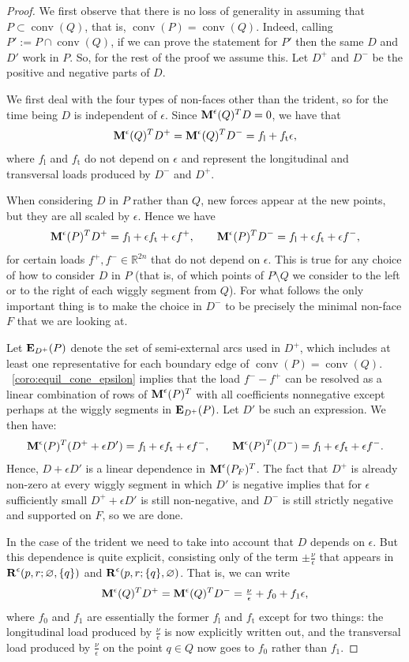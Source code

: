 \documentclass{amsart}
\theoremstyle{definition}
\newcommand{\R}{\mathbb{R}} %
\renewcommand{\b}[1]{{\boldsymbol{#1}}} %
\DeclareMathOperator{\conv}{conv} %
\newcommand{\Rvector}{\b{\rm R}} %
\newcommand{\lon}{\operatorname{l}} %
\newcommand{\trans}{\operatorname{t}} %
\newcommand{\Reps}{\Rvector^\epsilon} %
\newcommand{\Mmatrix}{\b{\rm M}} %
\newcommand{\Ematrix}{\b{\rm E}} %
\newcommand{\Meps}{\Mmatrix^\epsilon} %
\begin{document}
\begin{proof}
We first observe that there is no loss of generality in assuming that $P\subset \conv(Q)$, that is, $\conv(P)= \conv(Q)$. Indeed, calling $P' := P\cap \conv(Q)$, if we can prove the statement for $P'$ then the same $D$ and $D'$ work in $P$.
So, for the rest of the proof we assume this.
Let $D^+$ and $D^-$ be the positive and negative parts of $D$.

We first deal with the four types of non-faces other than the trident, so for the time being $D$ is independent of $\epsilon$.
%
Since $\Meps(Q)^T D = 0$, we have that
\[
\Meps(Q)^T D^+ = \Meps(Q)^T D^- = f_{\lon} + f_{\trans} \epsilon,
\]
where $f_{\lon}$ and $f_{\trans}$ do not depend on $\epsilon$ and represent the longitudinal and transversal loads produced by $D^-$ and $D^+$.

When considering $D$ in $P$ rather than $Q$, new forces appear at the new points, but they are all scaled by $\epsilon$. Hence we have
\[
\Meps(P)^T D^+ = f_{\lon} + \epsilon f_{\trans}  + \epsilon f^+, \qquad
\Meps(P)^T D^- = f_{\lon} + \epsilon f_{\trans} + \epsilon f^-,
\]
for certain loads $f^+,f^- \in \R^{2n}$ that do not  depend on $\epsilon$. 
This is true for any choice of how to consider $D$ in $P$ (that is, of which points of $P\setminus Q$ we consider to the left or to the right of each wiggly segment from $Q$). For what follows the only important thing is to make the choice in $D^-$ to be precisely  the minimal non-face $F$ that we are looking at. 

Let $\Ematrix_{D^+}(P)$ denote the set of semi-external arcs used in $D^+$, which includes at least one representative for each boundary edge of $\conv(P)= \conv(Q)$. 
~\cref{coro:equil_cone_epsilon} implies that the load $f^- - f^+$ can be resolved as a linear combination of rows of $\Meps(P)^T$ with all coefficients nonnegative except perhaps at the wiggly segments in $\Ematrix_{D^+}(P)$. Let $D'$ be such an expression. We then have:
\[
\Meps(P)^T (D^+ + \epsilon D') = f_{\lon} + \epsilon f_{\trans}  + \epsilon f^-, \qquad
\Meps(P)^T (D^-) = f_{\lon} + \epsilon f_{\trans} + \epsilon f^-.
\]
Hence, $D + \epsilon D'$ is a linear dependence in $\Meps(P_F)^T$.
The fact that $D^+$ is already non-zero at every wiggly segment in which $D'$ is negative implies that for $\epsilon$ sufficiently small  $D^+ + \epsilon D'$ is still non-negative, and $D^-$ is still strictly negative and supported on $F$, so we are done. 

In the case of the trident we need to take into account that $D$ depends on $\epsilon$. 
But this dependence is quite explicit, consisting only of the term $\pm\tfrac\nu\epsilon$ that appears in $\Reps(p,r; \varnothing, \{q\})$ and $\Reps(p,r; \{q\}, \varnothing)$. That is, we can write
\[
\Meps(Q)^T D^+ = \Meps(Q)^T D^- = \tfrac\nu\epsilon + f_{0} + f_{1} \epsilon,
\]
where $f_{0}$ and $f_{1}$ are essentially the former $f_{\lon}$ and $f_{\trans}$ except for two things: the longitudinal load produced by $\tfrac\nu\epsilon$ is now explicitly written out, and the transversal load produced by $\tfrac\nu\epsilon$ on the point $q\in Q$ now goes to $f_0$ rather than $f_1$.


\end{proof}
\end{document}
